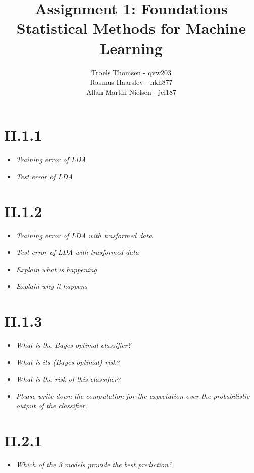 \documentclass[12pt, a4paper]{article}
\title{Assignment 1: Foundations\\Statistical Methods for Machine Learning}
\author{Troels Thomsen - qvw203\\Rasmus Haarslev - nkh877\\Allan Martin Nielsen - jcl187}
\begin{document}
\pagestyle{empty}
\maketitle
\newpage

\pagestyle{fancy}

\section{II.1.1}
\begin{itemize}
\item \textit{Training error of LDA}
\item \textit{Test error of LDA}
\end{itemize}

\section{II.1.2}
\begin{itemize}
\item \textit{Training error of LDA with trasformed data}
\item \textit{Test error of LDA with trasformed data}
\item \textit{Explain what is happening}
\item \textit{Explain why it happens}
\end{itemize}

\section{II.1.3}
\begin{itemize}
\item \textit{What is the Bayes optimal classifier?}
\item \textit{What is its (Bayes optimal) risk?}
\item \textit{What is the risk of this classifier?}
\item \textit{Please write down the computation for the expectation over the probabilistic output of the classifier.}
\end{itemize}

\section{II.2.1}
\begin{itemize}
\item \textit{Which of the 3 models provide the best prediction?}
\end{itemize}
\end{document}

